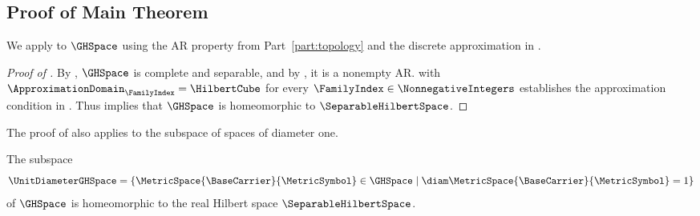 \subsection{Proof of Main Theorem}\label{subsec:approximation-hilbert-recognition}
We apply  to
$\GHSpace$
using the AR property from Part~\ref{part:topology}
and the discrete approximation in .

\begin{proof}[Proof of ]
By ,
$\GHSpace$
is complete and separable,
and by ,
it is a nonempty AR.
 with
$\ApproximationDomain_\FamilyIndex=\HilbertCube$
for every
$\FamilyIndex\in\NonnegativeIntegers$
establishes the approximation condition in .
Thus
 implies that
$\GHSpace$
is homeomorphic to
$\SeparableHilbertSpace$.
\end{proof}

The proof of  also applies to the subspace
of spaces of diameter one.

\begin{corollary}\label{cor:unit-diameter-hilbert-space}
The subspace
\[
 \UnitDiameterGHSpace
 =\{\MetricSpace{\BaseCarrier}{\MetricSymbol}\in\GHSpace
     \mid\diam\MetricSpace{\BaseCarrier}{\MetricSymbol}=1\}
\]
of
$\GHSpace$
is homeomorphic to the real Hilbert space
$\SeparableHilbertSpace$.
\end{corollary}

